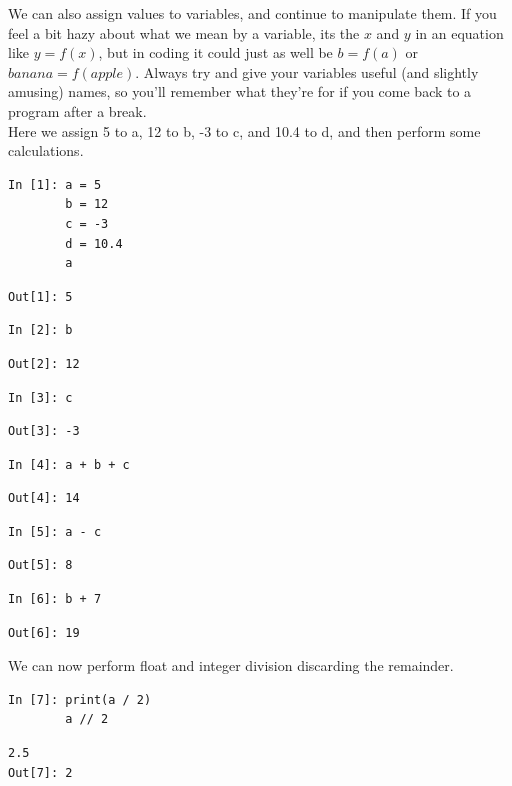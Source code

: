 We can also assign values to variables, and continue to manipulate them. If you feel a bit hazy about what we mean by a variable, its the $x$ and $y$ in an equation like $y = f(x)$, but in coding it could just as well be $b=f(a)$ or $banana=f(apple)$. Always try and give your variables useful (and slightly amusing) names, so you'll remember what they're for if you come back to a program after a break.\\

\noindent Here we assign 5 to a, 12 to b, -3 to c, and 10.4 to d, and then perform some calculations.
\begin{lstlisting}[style=PY]
In [1]: a = 5
        b = 12
        c = -3
        d = 10.4
        a
\end{lstlisting}
\begin{lstlisting}[style=PY, backgroundcolor=\color{white}]
Out[1]: 5
\end{lstlisting}
\begin{lstlisting}[style=PY]
In [2]: b
\end{lstlisting}
\begin{lstlisting}[style=PY, backgroundcolor=\color{white}]
Out[2]: 12
\end{lstlisting}
\begin{lstlisting}[style=PY]
In [3]: c
\end{lstlisting}
\begin{lstlisting}[style=PY, backgroundcolor=\color{white}]
Out[3]: -3
\end{lstlisting}
\begin{lstlisting}[style=PY]
In [4]: a + b + c
\end{lstlisting}
\begin{lstlisting}[style=PY, backgroundcolor=\color{white}]
Out[4]: 14
\end{lstlisting}
\begin{lstlisting}[style=PY]
In [5]: a - c
\end{lstlisting}
\begin{lstlisting}[style=PY, backgroundcolor=\color{white}]
Out[5]: 8
\end{lstlisting}
\begin{lstlisting}[style=PY]
In [6]: b + 7
\end{lstlisting}
\begin{lstlisting}[style=PY, backgroundcolor=\color{white}]
Out[6]: 19
\end{lstlisting}
We can now perform float and integer division discarding the remainder.
\begin{lstlisting}[style=PY]
In [7]: print(a / 2)
        a // 2
\end{lstlisting}
\begin{lstlisting}[style=PY, backgroundcolor=\color{white}]
        2.5
Out[7]: 2
\end{lstlisting}

